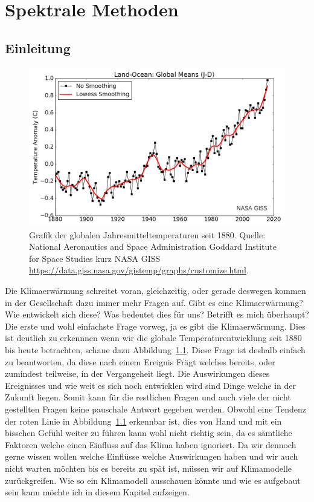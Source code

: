 \chapter{Spektrale Methoden\label{chapter:klima}}
\begin{refsection}

\rhead{}
\section{Einleitung
\label{klima:einleitung}}

\begin{figure}
\centering
\includegraphics[width=\hsize]{klima/nasa_giss.png}
\caption{Grafik der globalen Jahresmitteltemperaturen seit 1880. Quelle: National Aeronautics and Space Administration Goddard Institute for Space Studies kurz NASA GISS \url{https://data.giss.nasa.gov/gistemp/graphs/customize.html}.
\label{klima:einleitung:nasa}}
\end{figure}

Die Klimaerwärmung schreitet voran, gleichzeitig, oder gerade deswegen kommen in der Gesellschaft dazu immer mehr Fragen auf. Gibt es eine Klimaerwärmung? Wie entwickelt sich diese? Was bedeutet dies für uns? Betrifft es mich überhaupt? Die erste und wohl einfachste Frage vorweg, ja es gibt die Klimaerwärmung. Dies ist deutlich zu erkennnen wenn wir die globale Temperaturentwicklung seit 1880 bis heute betrachten, schaue dazu Abbildung~\ref{klima:einleitung:nasa}. Diese Frage ist deshalb einfach zu beantworten, da diese nach einem Ereignis Frägt welches bereits, oder zumindest teilweise, in der Vergangeheit liegt. Die Auswirkungen dieses Ereignisses und wie weit es sich noch entwicklen wird sind Dinge welche in der Zukunft liegen. Somit kann für die restlichen Fragen und auch viele der nicht gestellten Fragen keine pauschale Antwort gegeben werden. Obwohl eine Tendenz der roten Linie in Abbildung~\ref{klima:einleitung:nasa} erkennbar ist, dies von Hand und mit ein bisschen Gefühl weiter zu führen kann wohl nicht richtig sein, da es sämtliche Faktoren welche einen Einfluss auf das Klima haben ignoriert. Da wir dennoch gerne wissen wollen welche Einflüsse welche Auswirkungen haben und wir auch nicht warten möchten bis es bereits zu spät ist, müssen wir auf Klimamodelle zurückgreifen. Wie so ein Klimamodell ausschauen könnte und wie es aufgebaut sein kann möchte ich in diesem Kapitel aufzeigen.




\end{refsection}
